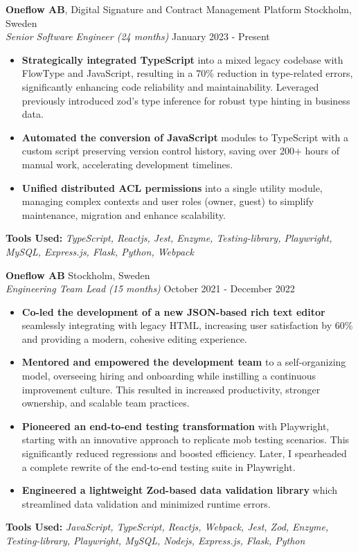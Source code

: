 \begin{minipage}[t]{0.61\textwidth}
\Large
\noindent
\textbf{\Large Oneflow AB}, Digital Signature and Contract Management Platform \hfill Stockholm, Sweden\\ %
\textit{Senior Software Engineer (24 months)} \hfill January 2023 - Present %
\begin{itemize}
\setlength{\itemsep}{0.5em}
    \item \textbf{Strategically integrated TypeScript} into a mixed legacy codebase with FlowType and JavaScript, resulting in a 70\% reduction in type-related errors, significantly enhancing code reliability and maintainability.
    Leveraged previously introduced zod's type inference for robust type hinting in business data.
    \item \textbf{Automated the conversion of JavaScript} modules to TypeScript with a custom script preserving version control history, saving over 200+ hours of manual work, accelerating development timelines.
    \item \textbf{Unified distributed ACL permissions} into a single utility module, managing complex contexts and user roles (owner, guest) to simplify maintenance, migration and enhance scalability.
\end{itemize}
\vspace{1em}
\textbf{Tools Used:} \textit{TypeScript, Reactjs, Jest, Enzyme, Testing-library, Playwright, MySQL, Express.js, Flask, Python, Webpack}

\vspace{1.5em}

\noindent
\textbf{Oneflow AB} \hfill Stockholm, Sweden\\
\textit{Engineering Team Lead (15 months)} \hfill October 2021 - December 2022 %
\begin{itemize}
\setlength{\itemsep}{0.5em}
    \item \textbf{Co-led the development of a new JSON-based rich text editor} seamlessly integrating with legacy HTML, increasing user satisfaction by 60\% and providing a modern, cohesive editing experience.
    \item \textbf{Mentored and empowered the development team} to a self-organizing model, overseeing hiring and onboarding while instilling a continuous improvement culture. This resulted in increased productivity, stronger ownership, and scalable team practices.
    \item \textbf{Pioneered an end-to-end testing transformation} with Playwright, starting with an innovative approach to replicate mob testing scenarios. This significantly reduced regressions and boosted efficiency.
    Later, I spearheaded a complete rewrite of the end-to-end testing suite in Playwright.
    \item \textbf{Engineered a lightweight Zod-based data validation library} which streamlined data validation and minimized runtime errors.
\end{itemize}

\vspace{1em}

\textbf{Tools Used:} \textit{JavaScript, TypeScript, Reactjs, Webpack, Jest, Zod, Enzyme, Testing-library, Playwright, MySQL, Nodejs, Express.js, Flask, Python}

\end{minipage}
